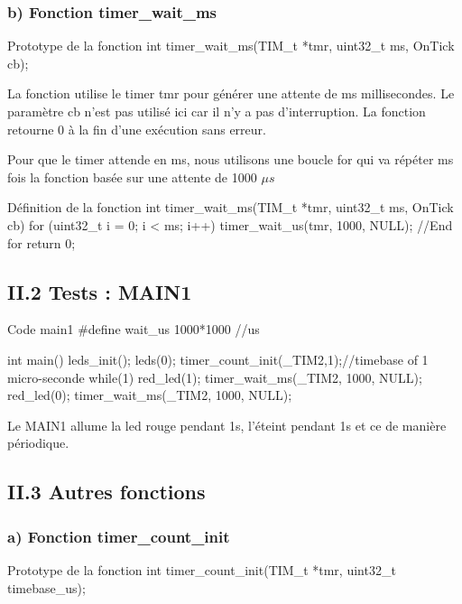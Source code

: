 \newpage
\subsubsection{b) Fonction timer\_wait\_ms}
\begin{Cpp}{Prototype de la fonction} 
int timer_wait_ms(TIM_t *tmr, uint32_t ms, OnTick cb);
\end{Cpp}

La fonction utilise le timer tmr pour générer une attente de ms millisecondes. Le paramètre cb n'est pas utilisé ici car il n'y a pas d'interruption. La fonction retourne 0 à la fin d'une exécution sans erreur.


Pour que le timer attende en ms, nous utilisons une boucle for qui va répéter ms fois la fonction  basée sur une attente de 1000 $\mu s$ \\


\begin{Cpp}{Définition de la fonction} 
int timer_wait_ms(TIM_t *tmr, uint32_t ms, OnTick cb) 
{
		for (uint32_t i = 0; i < ms; i++)
		{
			timer_wait_us(tmr, 1000, NULL);
		}//End for
	    return 0;
}
\end{Cpp}





\newpage
\subsection{II.2 Tests : MAIN1}

\begin{Cpp}{Code main1} 
#define wait_us           1000*1000   //us

int main()
{    
    leds_init();
    leds(0);
    timer_count_init(_TIM2,1);//timebase of 1 micro-seconde
    while(1)
    {
        red_led(1);
        timer_wait_ms(_TIM2, 1000, NULL);
        red_led(0);
        timer_wait_ms(_TIM2, 1000, NULL);
    }        
}   
\end{Cpp}

Le MAIN1 allume la led rouge pendant 1s, l'éteint pendant 1s et ce de manière périodique.


\newpage
\subsection{II.3 Autres fonctions}
\subsubsection{a) Fonction timer\_count\_init}
\begin{Cpp}{Prototype de la fonction} 
int timer_count_init(TIM_t *tmr, uint32_t timebase_us);
\end{Cpp}

